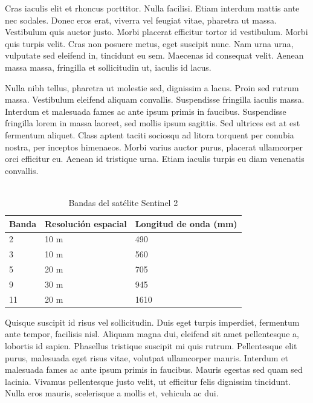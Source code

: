 \documentclass[a4paper,11pt]{article}
\begin{document}
Cras iaculis elit et rhoncus porttitor. Nulla facilisi. Etiam interdum mattis ante nec sodales. Donec eros erat, viverra vel feugiat vitae, pharetra ut massa. Vestibulum quis auctor justo. Morbi placerat efficitur tortor id vestibulum. Morbi quis turpis velit. Cras non posuere metus, eget suscipit nunc. Nam urna urna, vulputate sed eleifend in, tincidunt eu sem. Maecenas id consequat velit. Aenean massa massa, fringilla et sollicitudin ut, iaculis id lacus.

Nulla nibh tellus, pharetra ut molestie sed, dignissim a lacus. Proin sed rutrum massa. Vestibulum eleifend aliquam convallis. Suspendisse fringilla iaculis massa. Interdum et malesuada fames ac ante ipsum primis in faucibus. Suspendisse fringilla lorem in massa laoreet, sed mollis ipsum sagittis. Sed ultrices est at est fermentum aliquet. Class aptent taciti sociosqu ad litora torquent per conubia nostra, per inceptos himenaeos. Morbi varius auctor purus, placerat ullamcorper orci efficitur eu. Aenean id tristique urna. Etiam iaculis turpis eu diam venenatis convallis.\\\\

\begin{table}[htb]
	\begin{center}
		\begin{tabular}{|l|l|l|}
			\hline
			Banda & Resolución espacial & Longitud de onda (mm) \\
			\hline \hline
			2 & 10 m & 490 \\ \hline
			3 & 10 m & 560 \\ \hline
			5 & 20 m & 705 \\ \hline
			9 & 30 m & 945 \\ \hline
			11 & 20 m & 1610 \\ \hline
		\end{tabular}
		\caption{Bandas del satélite Sentinel 2}
	\end{center}
\end{table}

Quisque suscipit id risus vel sollicitudin. Duis eget turpis imperdiet, fermentum ante tempor, facilisis nisl. Aliquam magna dui, eleifend sit amet pellentesque a, lobortis id sapien. Phasellus tristique suscipit mi quis rutrum. Pellentesque elit purus, malesuada eget risus vitae, volutpat ullamcorper mauris. Interdum et malesuada fames ac ante ipsum primis in faucibus. Mauris egestas sed quam sed lacinia. Vivamus pellentesque justo velit, ut efficitur felis dignissim tincidunt. Nulla eros mauris, scelerisque a mollis et, vehicula ac dui.
\end{document}
